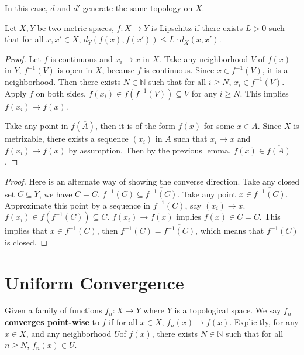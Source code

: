 \documentclass[article,11pt, reqno]{article}
\newtheorem*{lemma}{Lemma}
\theoremstyle{remark}
\newcommand{\tb}{\textbf}
\newcommand{\mb}{\mathbb}
\newcommand{\<}{\langle}
\renewcommand{\>}{\rangle}
\begin{document}
In this case, $d$ and $d'$ generate the same topology on $X$.

Let $X, Y$ be two metric spaces, $f:X\rightarrow Y$ is Lipschitz if there exists $L>0$ such that for all $x, x'\in X$, $d_Y(f(x), f(x'))\leq L\cdot d_X(x, x')$.\\
\begin{proof}
    Let $f$ is continuous and $x_i\rightarrow x$ in $X$. Take any neighborhood $V$ of $f(x)$ in $Y$, $f^{-1}(V)$ is open in $X$, because $f$ is continuous. Since $x\in f^{-1}(V)$, it is a neighborhood. Then there exists $N\in\mb N$ such that for all $i\geq N$, $x_i\in f^{-1}(V)$. Apply $f$ on both sides, 
    $f(x_i)\in f(f^{-1}(V))\subseteq V$ for any $i\geq N$. This implies $f(x_i)\rightarrow f(x)$.

    Take any point in $f(\overline A)$, then it is of the form $f(x)$ for some $x\in A$. Since $X$ is metrizable, there exists a sequence $(x_i)$ in $A$ such that $x_i\rightarrow x$ and $f(x_i)\rightarrow f(x)$ by assumption. Then by the previous lemma, $f(x)\in\overline{f(A)}$.
\end{proof}

\begin{proof}
    Here is an alternate way of showing the converse direction. Take any closed set $C\subseteq Y$, we have $\overline C=C$. $f^{-1}(C)\subseteq\overline{f^{-1}(C)}$. Take any point $x\in \overline{f^{-1}(C)}$. Approximate this point by a sequence in $f^{-1}(C)$, say $(x_i)\rightarrow x$. $f(x_i)\in f(f^{-1}(C))\subseteq C$. $f(x_i)\rightarrow f(x)$ implies $f(x)\in\overline C=C$. This implies that $x\in f^{-1}(C)$, then $f^{-1}(C)=\overline{f^{-1}(C)}$, which means that $f^{-1}(C)$ is closed.
\end{proof}

\section{Uniform Convergence}
Given a family of functions $f_n: X\rightarrow Y$ where $Y$ is a topological space. We say $f_n$ \tb{converges point-wise} to $f$ if for all $x\in X$, $f_n(x)\rightarrow f(x)$. Explicitly, for any $x\in X$, and any neighborhood $U$of $f(x)$, there exists $N\in\mb N$ such that for all $n\geq N$, $f_n(x)\in U$.
\end{document}
